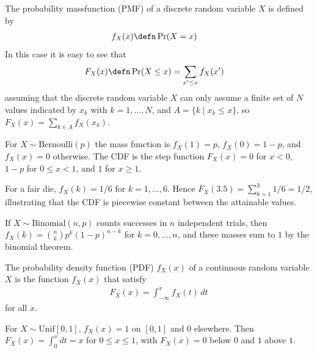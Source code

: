 \documentclass[a4paper, 12pt]{book}
\begin{document}
\begin{definition}
    The probability massfunction (PMF) of a discrete random variable $X$ is defined by
    \begin{align}
        f_X(x) &\defn \Pr(X=x)
    \end{align}
    In this case it is easy to see that
    \begin{align}
        F_X(x) &\defn \Pr(X \leq x) = \sum_{x' \leq x} f_X(x')
    \end{align}
    assuming that the discrete random variable $X$ can only assume a finite set of $N$ values indicated by $x_k$ with $k=1,\ldots,N$, and $A=\{k \mid x_k \leq x\}$, so $F_X(x)=\sum_{k \in A} f_X(x_k)$.
\end{definition}
\begin{example}
    For $X\sim\mathrm{Bernoulli}(p)$ the mass function is $f_X(1)=p$, $f_X(0)=1-p$, and $f_X(x)=0$ otherwise. The CDF is the step function $F_X(x)=0$ for $x<0$, $1-p$ for $0\leq x<1$, and $1$ for $x\geq1$.
\end{example}

\begin{example}
    For a fair die, $f_X(k)=1/6$ for $k=1,\ldots,6$. Hence $F_X(3.5)=\sum_{k=1}^3 1/6=1/2$, illustrating that the CDF is piecewise constant between the attainable values.
\end{example}

\begin{example}
    If $X\sim\mathrm{Binomial}(n,p)$ counts successes in $n$ independent trials, then $f_X(k)=\binom{n}{k}p^k(1-p)^{n-k}$ for $k=0,\ldots,n$, and these masses sum to $1$ by the binomial theorem.
\end{example}

\begin{definition}
The probability density function (PDF) $f_X(x)$ of a continuous random variable $X$ is the function $f_X(x)$ that satisfy
\begin{align}
    F_X(x) = \int_{-\infty}^x f_X(t)\,dt
\end{align}
for all $x$.
\end{definition}
\begin{example}
    For $X\sim\mathrm{Unif}[0,1]$, $f_X(x)=1$ on $[0,1]$ and $0$ elsewhere. Then $F_X(x)=\int_0^x dt=x$ for $0\leq x\leq1$, with $F_X(x)=0$ below $0$ and $1$ above $1$.
\end{example}
\end{document}
